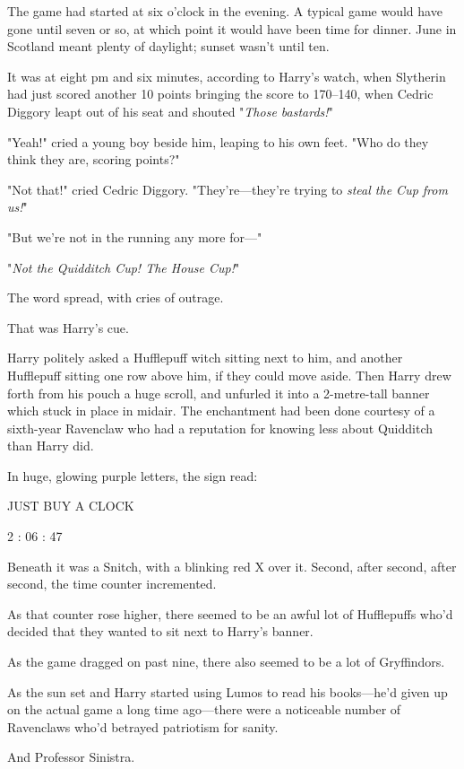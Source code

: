 The game had started at six o'clock in the evening. A typical game would
have gone until seven or so, at which point it would have been time for dinner.
June in Scotland meant plenty of daylight; sunset wasn't until ten.

It was at eight pm and six minutes, according to Harry's watch, when Slytherin
had just scored another 10 points bringing the score to 170--{140}, when Cedric
Diggory leapt out of his seat and shouted "\emph{Those bastards!}"

"Yeah!" cried a young boy beside him, leaping to his own feet. "Who do they
think they are, scoring points?"

"Not that!" cried Cedric Diggory. "They're—they're trying to \emph{steal the
Cup from us!}"

"But we're not in the running any more for—"

"\emph{Not the Quidditch Cup! The House Cup!}"

The word spread, with cries of outrage.

That was Harry's cue.

Harry politely asked a Hufflepuff witch sitting next to him, and another
Hufflepuff sitting one row above him, if they could move aside. Then Harry drew
forth from his pouch a huge scroll, and unfurled it into a 2-metre-tall banner
which stuck in place in midair. The enchantment had been done courtesy of a
sixth-year Ravenclaw who had a reputation for knowing less about Quidditch than
Harry did.

In huge, glowing purple letters, the sign read:

\begin{center}
JUST BUY A CLOCK

2 : 06 : 47
\end{center}

Beneath it was a Snitch, with a blinking red X over it.
\later
Second, after second, after second, the time counter incremented.

As that counter rose higher, there seemed to be an awful lot of Hufflepuffs
who'd decided that they wanted to sit next to Harry's banner.

As the game dragged on past nine, there also seemed to be a lot of Gryffindors.

As the sun set and Harry started using Lumos to read his books—he'd given up
on the actual game a long time ago—there were a noticeable number of
Ravenclaws who'd betrayed patriotism for sanity.

And Professor Sinistra.

